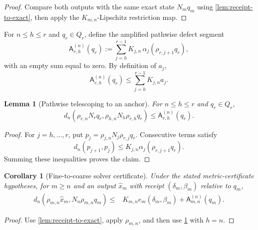 \documentclass[11pt]{article}
\newtheorem{lemma}[theorem]{Lemma}
\newtheorem{corollary}[theorem]{Corollary}
\theoremstyle{definition}
\theoremstyle{remark}
\numberwithin{equation}{section}
\begin{document}
\begin{proof}
Compare both outputs with the same exact state $N_mq_m$ using
\cref{lem:receipt-to-exact}, then apply the $K_{m,n}$-Lipschitz restriction
map.
\end{proof}

For $n\le h\le r$ and $q_r\in Q_r$, define the amplified pathwise defect
segment
\[
 \mathsf A_{r,h}^{(n)}(q_r)
 :=
 \sum_{j=h}^{r-1}
 K_{j,n}\,
 \alpha_j\!\left(\rho_{r,j+1}q_r\right),
\]
with an empty sum equal to zero.  By definition of $a_j$,
\[
 \mathsf A_{r,h}^{(n)}(q_r)
 \le
 \sum_{j=h}^{r-1}K_{j,n}a_j.
\]

\begin{lemma}[Pathwise telescoping to an anchor]\label{lem:pathwise-anchor}
For $n\le h\le r$ and $q_r\in Q_r$,
\[
 d_n\!\left(
 \rho_{r,n}N_rq_r,
 \rho_{h,n}N_h\rho_{r,h}q_r
 \right)
 \le
 \mathsf A_{r,h}^{(n)}(q_r).
\]
\end{lemma}

\begin{proof}
For $j=h,\ldots,r$, put
$p_j=\rho_{j,n}N_j\rho_{r,j}q_r$.  Consecutive terms satisfy
\[
 d_n(p_{j+1},p_j)
 \le
 K_{j,n}\alpha_j(\rho_{r,j+1}q_r).
\]
Summing these inequalities proves the claim.
\end{proof}

\begin{corollary}[Fine-to-coarse solver certificate]
\label{cor:fine-to-coarse-solver}
Under the stated metric-certificate hypotheses, for $m\ge n$ and an output $\widehat x_m$ with receipt
$(\delta_m,\beta_m)$ relative to $q_m$,
\[
\begin{split}
 d_n\!\left(
 \rho_{m,n}\widehat x_m,
 N_n\rho_{m,n}q_m
 \right)
 \le{}&
 K_{m,n}e_m(\delta_m,\beta_m)
 +\mathsf A_{m,n}^{(n)}(q_m).
\end{split}
\]
\end{corollary}

\begin{proof}
Use \cref{lem:receipt-to-exact}, apply $\rho_{m,n}$, and then use
\cref{lem:pathwise-anchor} with $h=n$.
\end{proof}
\end{document}
